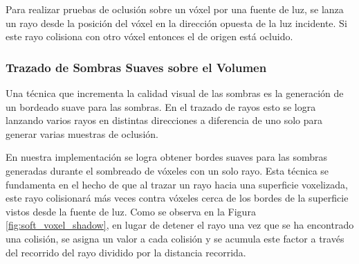 Para realizar pruebas de oclusión sobre un vóxel por una fuente de luz, se lanza un rayo desde la posición del vóxel en la dirección opuesta de la luz incidente. Si este rayo colisiona con otro vóxel entonces el de origen está ocluido.

\subsubsection{Trazado de Sombras Suaves sobre el Volumen}

Una técnica que incrementa la calidad visual de las sombras es la generación de un bordeado suave para las sombras. En el trazado de rayos esto se logra lanzando varios rayos en distintas direcciones a diferencia de uno solo para generar varias muestras de oclusión.

En nuestra implementación se logra obtener bordes suaves para las sombras generadas durante el sombreado de vóxeles con un solo rayo. Esta técnica se fundamenta en el hecho de que al trazar un rayo hacia una superficie voxelizada, este rayo colisionará más veces contra vóxeles cerca de los bordes de la superficie vistos desde la fuente de luz. Como se observa en la Figura \ref{fig:soft_voxel_shadow}, en lugar de detener el rayo una vez que se ha encontrado una colisión, se asigna un valor a cada colisión y se acumula este factor a través del recorrido del rayo dividido por la distancia recorrida.

